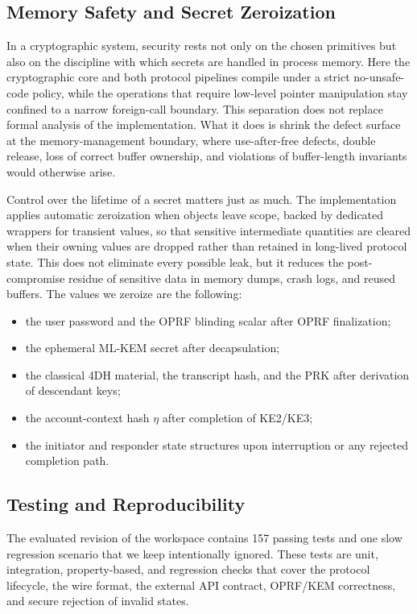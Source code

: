 \documentclass[preprint,12pt]{elsarticle}
\newcommand{\codeid}[1]{\textsf{#1}}
\theoremstyle{remark}
\begin{document}
\subsection{Memory Safety and Secret Zeroization}

In a cryptographic system, security rests not only on the chosen
primitives but also on the discipline with which secrets are handled in
process memory. Here the cryptographic core and both protocol pipelines
compile under a strict no-\codeid{unsafe}-code policy, while the
operations that require low-level pointer manipulation stay confined to a
narrow foreign-call boundary. This separation does not replace formal
analysis of the implementation. What it does is shrink the defect
surface at the memory-management boundary, where use-after-free defects,
double release, loss of correct buffer ownership, and violations of
buffer-length invariants would otherwise arise.

Control over the lifetime of a secret matters just as much. The
implementation applies automatic zeroization when objects leave scope,
backed by dedicated wrappers for transient values, so that sensitive
intermediate quantities are cleared when their owning values are dropped
rather than retained in long-lived protocol state. This does not eliminate every possible leak, but it
reduces the post-compromise residue of sensitive data in memory dumps,
crash logs, and reused buffers. The values we zeroize are the
following:
\begin{itemize}
  \item the user password and the OPRF blinding scalar after OPRF
        finalization;
  \item the ephemeral ML-KEM secret after decapsulation;
  \item the classical 4DH material, the transcript hash, and the PRK
        after derivation of descendant keys;
  \item the account-context hash $\eta$ after completion of
        KE2/KE3;
  \item the initiator and responder state structures upon interruption
        or any rejected completion path.
\end{itemize}

\subsection{Testing and Reproducibility}

The evaluated revision of the workspace contains 157 passing tests and
one slow regression scenario that we keep intentionally ignored. These tests
are unit, integration, property-based, and regression checks that cover
the protocol lifecycle, the wire format, the external API contract,
OPRF/KEM correctness, and secure rejection of invalid states.
\end{document}
